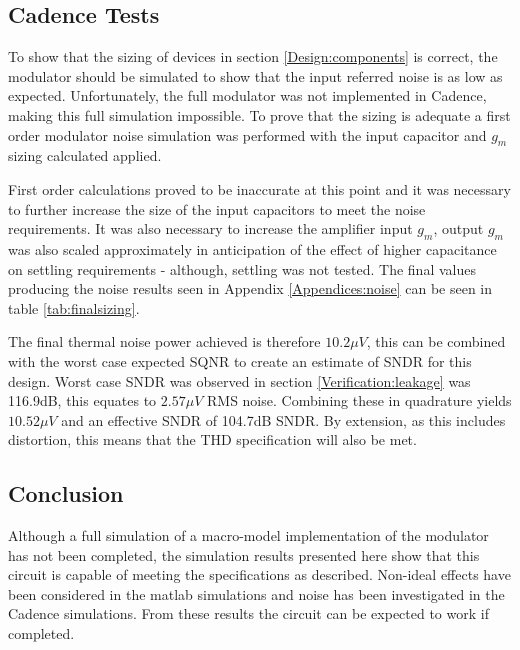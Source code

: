     \subsection{Cadence Tests}
    To show that the sizing of devices in section \ref{Design:components} is correct, the modulator should be simulated to show that the input referred noise is as low as expected.
    Unfortunately, the full modulator was not implemented in Cadence, making this full simulation impossible.
    To prove that the sizing is adequate a first order modulator noise simulation was performed with the input capacitor and $g_{m}$ sizing calculated applied.

    First order calculations proved to be inaccurate at this point and it was necessary to further increase the size of the input capacitors to meet the noise requirements.
    It was also necessary to increase the amplifier input $g_{m}$, output $g_{m}$ was also scaled approximately in anticipation of the effect of higher capacitance on settling requirements - although, settling was not tested.
    The final values producing the noise results seen in Appendix \ref{Appendices:noise} can be seen in table \ref{tab:finalsizing}.

    

    The final thermal noise power achieved is therefore $10.2\mu V$, this can be combined with the worst case expected SQNR to create an estimate of SNDR for this design.
    Worst case SNDR was observed in section \ref{Verification:leakage} was 116.9dB, this equates to $2.57\mu V$ RMS noise.
    Combining these in quadrature yields $10.52\mu V$ and an effective SNDR of 104.7dB SNDR.
    By extension, as this includes distortion, this means that the THD specification will also be met.

\subsection{Conclusion}
\label{Verification:conclusion}
Although a full simulation of a macro-model implementation of the modulator has not been completed, the simulation results presented here show that this circuit is capable of meeting the specifications as described.
Non-ideal effects have been considered in the matlab simulations and noise has been investigated in the Cadence simulations.
From these results the circuit can be expected to work if completed.

